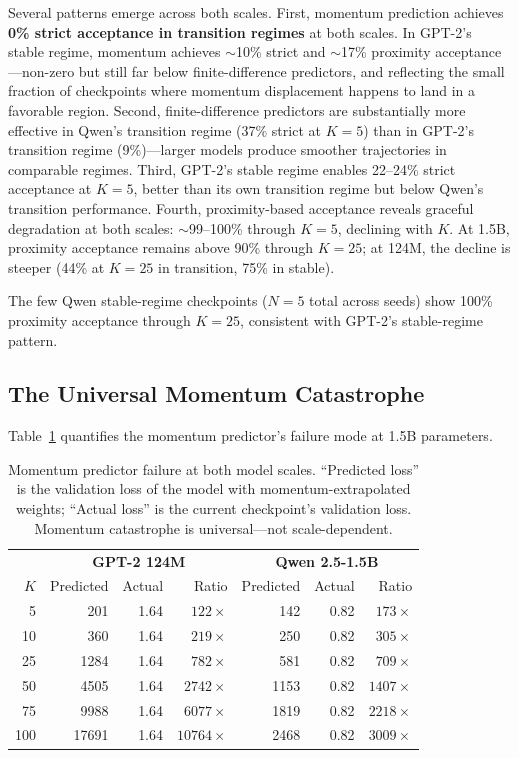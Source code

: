 \documentclass{article}
\begin{document}
Several patterns emerge across both scales.
First, momentum prediction achieves \textbf{0\% strict acceptance in transition regimes} at both scales.
In GPT-2's stable regime, momentum achieves $\sim$10\% strict and $\sim$17\% proximity acceptance---non-zero but still far below finite-difference predictors, and reflecting the small fraction of checkpoints where momentum displacement happens to land in a favorable region.
Second, finite-difference predictors are substantially more effective in Qwen's transition regime (37\% strict at $K{=}5$) than in GPT-2's transition regime (9\%)---larger models produce smoother trajectories in comparable regimes.
Third, GPT-2's stable regime enables 22--24\% strict acceptance at $K{=}5$, better than its own transition regime but below Qwen's transition performance.
Fourth, proximity-based acceptance reveals graceful degradation at both scales: $\sim$99--100\% through $K{=}5$, declining with $K$.
At 1.5B, proximity acceptance remains above 90\% through $K{=}25$; at 124M, the decline is steeper (44\% at $K{=}25$ in transition, 75\% in stable).

The few Qwen stable-regime checkpoints ($N{=}5$ total across seeds) show 100\% proximity acceptance through $K{=}25$, consistent with GPT-2's stable-regime pattern.

\subsection{The Universal Momentum Catastrophe}
\label{sec:results:momentum}

Table~\ref{tab:momentum_catastrophe} quantifies the momentum predictor's failure mode at 1.5B parameters.

\begin{table}[h]
\centering
\caption{Momentum predictor failure at both model scales.
``Predicted loss'' is the validation loss of the model with momentum-extrapolated weights; ``Actual loss'' is the current checkpoint's validation loss.
Momentum catastrophe is universal---not scale-dependent.}
\label{tab:momentum_catastrophe}
\begin{tabular}{r|rrr|rrr}
\toprule
& \multicolumn{3}{c|}{\textbf{GPT-2 124M}} & \multicolumn{3}{c}{\textbf{Qwen 2.5-1.5B}} \\
$K$ & Predicted & Actual & Ratio & Predicted & Actual & Ratio \\
\midrule
5   & 201   & 1.64 & $122\times$    & 142   & 0.82 & $173\times$ \\
10  & 360   & 1.64 & $219\times$    & 250   & 0.82 & $305\times$ \\
25  & 1284  & 1.64 & $782\times$    & 581   & 0.82 & $709\times$ \\
50  & 4505  & 1.64 & $2742\times$   & 1153  & 0.82 & $1407\times$ \\
75  & 9988  & 1.64 & $6077\times$   & 1819  & 0.82 & $2218\times$ \\
100 & 17691 & 1.64 & $10764\times$  & 2468  & 0.82 & $3009\times$ \\
\bottomrule
\end{tabular}
\end{table}
\end{document}
